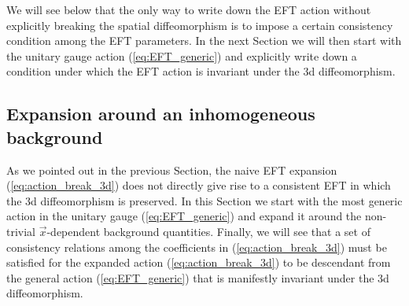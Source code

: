 \documentclass[a4paper,11pt]{article}
\numberwithin{equation}{section}
\begin{document}
We will see below that the only way to write down the EFT action without explicitly breaking the spatial diffeomorphism is to impose a certain consistency condition among the EFT parameters. In the next Section we will then start with the unitary gauge action (\ref{eq:EFT_generic}) and explicitly write down a condition under which the EFT action is invariant under the 3d diffeomorphism.


\subsection{Expansion around an inhomogeneous background}


As we pointed out in the previous Section, the naive EFT expansion (\ref{eq:action_break_3d}) does not directly give rise to a consistent EFT in which the 3d diffeomorphism is preserved. In this Section we start with the most generic action in the unitary gauge (\ref{eq:EFT_generic}) and expand it around the non-trivial $\vec{x}$-dependent background quantities. Finally, we will see that a set of consistency relations among the coefficients in (\ref{eq:action_break_3d}) must be satisfied for the expanded action (\ref{eq:action_break_3d}) to be descendant from the general action (\ref{eq:EFT_generic}) that is manifestly invariant under the 3d diffeomorphism. 
\end{document}
